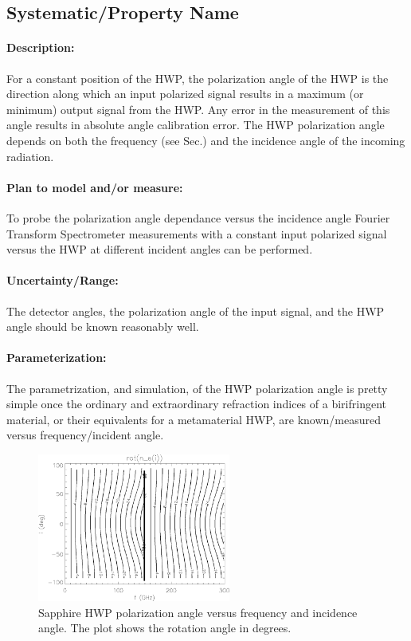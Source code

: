 \subsection{Systematic/Property Name}

\paragraph{Description:}
For a constant position of the HWP, the polarization angle of the HWP is the 
direction along which an input polarized signal results in a maximum (or minimum) output signal
from the HWP. Any error in the measurement of this angle results in absolute angle calibration error. The HWP polarization angle depends 
on both the frequency (see Sec.) and the incidence angle of the incoming radiation.


\paragraph{Plan to model and/or measure:}
To probe the polarization angle dependance versus the incidence angle Fourier Transform Spectrometer measurements with a constant 
input polarized signal versus the HWP at different incident angles can be performed.

\paragraph{Uncertainty/Range:}
The detector angles, the polarization angle of the input signal, and the
HWP angle should be known reasonably well.


\paragraph{Parameterization:}
The parametrization, and simulation, of the HWP polarization angle is pretty simple once the ordinary and extraordinary refraction indices
of a birifringent material, or their equivalents for a metamaterial HWP, are known/measured versus frequency/incident angle.


\begin{figure}
\centering
\includegraphics[width=2.5in]{figures/polanglei.png}
\caption{Sapphire HWP polarization angle versus frequency and incidence angle. The plot shows the rotation angle in degrees.}
\label{4pixelwobbleremoval}
\end{figure}
